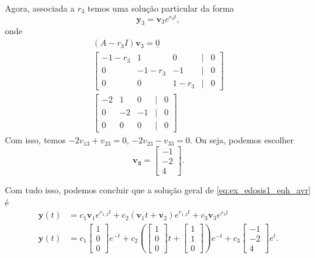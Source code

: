 \begin{ex}
  Agora, associada a $r_3$ temos uma solução particular da forma
  \begin{equation}
    \pmb{y}_3 = \pmb{v}_3e^{r_3t},
  \end{equation}
  onde
  \begin{gather}
    (A-r_3I)\pmb{v}_3 = \underline{0} \\
    \begin{bmatrix}
      -1-r_3 & 1 & 0 & | & 0 \\
      0 & -1-r_3 & -1 & | & 0 \\
      0 & 0 & 1-r_3 & | & 0 
    \end{bmatrix}\\
    \begin{bmatrix}
      -2 & 1 & 0 & | & 0 \\
      0 & -2 & -1 & | & 0 \\
      0 & 0 & 0 & | & 0 
    \end{bmatrix}
  \end{gather}  
  Com isso, temos $-2v_{13}+v_{23}=0$, $-2v_{23}-v_{33}=0$. Ou seja, podemos escolher
  \begin{equation}
    \pmb{v_3} =
    \begin{bmatrix}
      -1 \\
      -2 \\
      4
    \end{bmatrix}.
  \end{equation}

  Com tudo isso, podemos concluir que a solução geral de \eqref{eq:ex_edosis1_eqh_avr} é
  \begin{align}
    \pmb{y}(t) &= c_1\pmb{v}_1e^{r_{1,2}t}+c_2\left(\pmb{v}_1t+\pmb{v}_2\right)e^{r_{1,2}t} + c_3\pmb{v}_3e^{r_3t} \\
    \pmb{y}(t) &= c_1
                 \begin{bmatrix}
                   1\\
                   0\\
                   0
                 \end{bmatrix}e^{-t} + c_2\left(
    \begin{bmatrix}
      1\\
      0\\
      0
    \end{bmatrix}t +
    \begin{bmatrix}
      1\\
      1\\
      0
    \end{bmatrix}\right)e^{-t} + c_3
    \begin{bmatrix}
      -1\\
      -2\\
      4
    \end{bmatrix}e^t.
  \end{align}
\end{ex}

